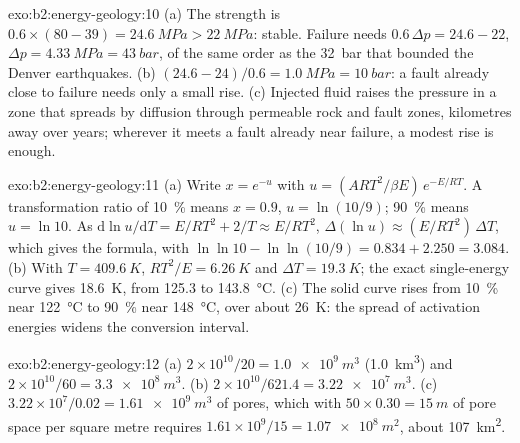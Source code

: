 \begin{solution}{exo:b2:energy-geology:10}
(a) The strength is $0.6 \times (80 - 39) = \qty{24.6}{MPa} > \qty{22}{MPa}$: stable. Failure needs
$0.6\,\Delta p = 24.6 - 22$, $\Delta p = \qty{4.33}{MPa} = \qty{43}{bar}$, of the same order as the
\qty{32}{bar} that bounded the Denver earthquakes. (b) $(24.6 - 24)/0.6 = \qty{1.0}{MPa} =
\qty{10}{bar}$: a fault already close to failure needs only a small rise. (c) Injected fluid raises
the pressure in a zone that spreads by diffusion through permeable rock and fault zones, kilometres
away over years; wherever it meets a fault already near failure, a modest rise is enough.
\end{solution}

\begin{solution}{exo:b2:energy-geology:11}
(a) Write $x = e^{-u}$ with $u = (ART^2/\beta E)\,e^{-E/RT}$. A transformation ratio of
\qty{10}{\percent} means $x = 0.9$, $u = \ln(10/9)$; \qty{90}{\percent} means $u = \ln 10$. As
$\mathrm{d}\ln u/\mathrm{d}T = E/RT^2 + 2/T \approx E/RT^2$, $\Delta(\ln u) \approx (E/RT^2)\,\Delta T$,
which gives the formula, with $\ln\ln 10 - \ln\ln(10/9) = 0.834 + 2.250 = 3.084$. (b) With $T =
\qty{409.6}{K}$, $RT^2/E = \qty{6.26}{K}$ and $\Delta T = \qty{19.3}{K}$; the exact single-energy
curve gives \qty{18.6}{K}, from 125.3 to \qty{143.8}{\celsius}. (c) The solid curve rises from
\qty{10}{\percent} near \qty{122}{\celsius} to \qty{90}{\percent} near \qty{148}{\celsius}, over about
\qty{26}{K}: the spread of activation energies widens the conversion interval.
\end{solution}

\begin{solution}{exo:b2:energy-geology:12}
(a) $2 \times 10^{10}/20 = \qty{1.0e9}{m^3}$ (\qty{1.0}{km^3}) and $2 \times 10^{10}/60 =
\qty{3.3e8}{m^3}$. (b) $2 \times 10^{10}/621.4 = \qty{3.22e7}{m^3}$. (c) $3.22 \times 10^7/0.02 =
\qty{1.61e9}{m^3}$ of pores, which with $50 \times 0.30 = \qty{15}{m}$ of pore space per square
metre requires $1.61 \times 10^9/15 = \qty{1.07e8}{m^2}$, about \qty{107}{km^2}.
\end{solution}

